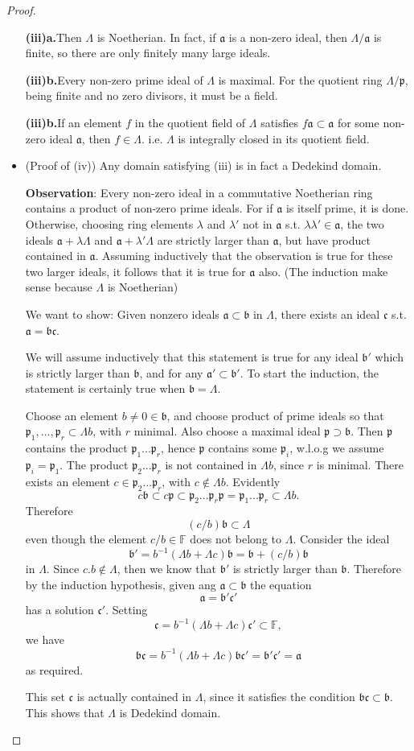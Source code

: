\documentclass[11pt]{article}
\newcommand{\bbf}{\mathbb F}
\newcommand{\sca}{{\mathfrak a}}
\newcommand{\scb}{{\mathfrak b}}
\newcommand{\scc}{{\mathfrak c}}
\newcommand{\scp}{{\mathfrak p}}
\begin{document}
\begin{proof}
\begin{itemize}
	\textbf{(iii)a.}Then $\Lambda$ is Noetherian.
	In fact, if $\sca$ is a non-zero ideal, then $\Lambda/\sca$ is finite, so there are only finitely many large ideals.

	\textbf{(iii)b.}Every non-zero prime ideal of $\Lambda$ is maximal.
	For the quotient ring $\Lambda/\scp$, being finite and no zero divisors, it must be a field.

	\textbf{(iii)b.}If an element $f$ in the quotient field of $\Lambda$ satisfies $f\sca\subset \sca$ for some non-zero ideal $\sca$, then $f\in \Lambda$. i.e. $\Lambda$ is integrally closed in its quotient field.
\item (Proof of (iv))
	 Any domain satisfying
	(iii) is in fact a Dedekind domain.

	\textbf{Observation}: Every non-zero ideal in a commutative Noetherian ring contains a product of non-zero prime ideals. For if $\sca$ is itself prime, it is done. Otherwise, choosing ring elements $\lambda$ and $\lambda'$ not in $\sca$ s.t. $\lambda\lambda'\in \sca$, the two ideals $\sca+\lambda\Lambda$ and $\sca+\lambda'\Lambda$ are strictly larger than $\sca$, but have product contained in $\sca$. Assuming inductively that the observation is true for these two larger ideals, it follows that it is true for $\sca$ also. (The induction make sense because $\Lambda$ is Noetherian)

	We want to show:
	Given nonzero ideals $\sca\subset \scb$ in $\Lambda$, there exists an ideal $\scc$ s.t. $\sca=\scb\scc$.

	We will assume inductively that this statement is true for any ideal $\scb'$ which is strictly larger than $\scb$, and for any $\sca'\subset \scb'$. To start the induction, the statement is certainly true when $\scb=\Lambda$.

	Choose an element $b\neq 0\in\scb$, and choose product of prime ideals so that $\scp_1,...,\scp_r\subset \Lambda b$, with $r$ minimal. Also choose a maximal ideal $\scp\supset \scb$. Then $\scp $ contains the product $\scp_1...\scp_r$, hence $\scp$ contains some $\scp_i$, w.l.o.g we assume $\scp_i=\scp_1$. The product $\scp_2...\scp_r$ is not contained in $\Lambda b$, since $r$ is minimal. There exists an element $c\in \scp_2...\scp_r$, with $c\not \in \Lambda b$. Evidently
	$$
	c\scb\subset c\scp\subset \scp_2...\scp_r\scp=\scp_1...\scp_r\subset \Lambda b.
	$$
	Therefore 
	$$
	(c/b)\scb\subset \Lambda
	$$
	even though the element $c/b\in \bbf$ does not belong to $\Lambda$. Consider the ideal 
	$$
	\scb'=b^{-1}(\Lambda b+\Lambda c)\scb=\scb+(c/b)\scb
	$$
	in $\Lambda$. Since $c.b\not \in \Lambda$, then we know that $\scb'$ is strictly larger than $\scb$. Therefore by the induction hypothesis, given ang $\sca\subset \scb$ the equation
	$$
	\sca=\scb'\scc'
	$$
	has a solution $\scc'$. Setting 
	$$
	\scc=b^{-1}(\Lambda b+\Lambda c)\scc'\subset \bbf,
	$$
	we have 
	$$
	\scb\scc=b^{-1}(\Lambda b+\Lambda c)\scb\scc'=\scb'\scc'=\sca
	$$
	as required. 

	This set $\scc$ is actually contained in $\Lambda$, since it satisfies the condition $\scb\scc\subset \scb$.
	This shows that $\Lambda$ is Dedekind domain.
\end{itemize}
\end{proof}
\end{document}
